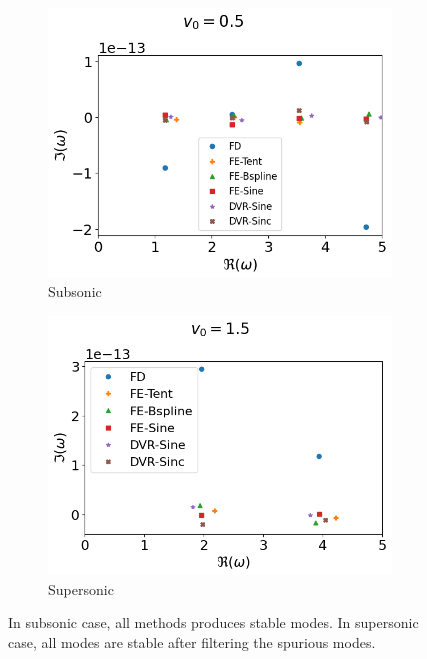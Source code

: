 \begin{figure}[H]
	\centering
	\begin{subfigure}{0.5\textwidth}
		\includegraphics[width=\linewidth]{img/numerical_experiments/constant_v_v0=0.5}
		\caption{Subsonic}
	\end{subfigure}%
	\begin{subfigure}{0.5\textwidth}
		\includegraphics[width=\linewidth]{img/numerical_experiments/constant_v_v0=1.5}
		\caption{Supersonic}
	\end{subfigure}
	\caption{In subsonic case, all methods produces stable modes. In supersonic case, all modes are stable after filtering the spurious modes.}
	\label{fig:constant_v}
\end{figure}


